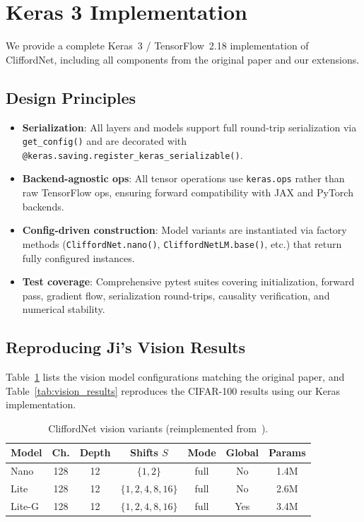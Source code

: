 \documentclass{article}
\begin{document}
\section{Keras 3 Implementation}
\label{sec:implementation}

We provide a complete Keras~3 / TensorFlow~2.18 implementation of CliffordNet, including all components from the original paper and our extensions.

\subsection{Design Principles}

\begin{itemize}
  \item \textbf{Serialization}: All layers and models support full round-trip serialization via \texttt{get\_config()} and are decorated with \texttt{@keras.saving.register\_keras\_serializable()}.
  \item \textbf{Backend-agnostic ops}: All tensor operations use \texttt{keras.ops} rather than raw TensorFlow ops, ensuring forward compatibility with JAX and PyTorch backends.
  \item \textbf{Config-driven construction}: Model variants are instantiated via factory methods (\texttt{CliffordNet.nano()}, \texttt{CliffordNetLM.base()}, etc.) that return fully configured instances.
  \item \textbf{Test coverage}: Comprehensive pytest suites covering initialization, forward pass, gradient flow, serialization round-trips, causality verification, and numerical stability.
\end{itemize}

\subsection{Reproducing Ji's Vision Results}

Table~\ref{tab:vision_variants} lists the vision model configurations matching the original paper, and Table~\ref{tab:vision_results} reproduces the CIFAR-100 results using our Keras implementation.

\begin{table}[t]
\centering
\caption{CliffordNet vision variants (reimplemented from~\citet{ji2026cliffordnet}).}
\label{tab:vision_variants}
\begin{tabular}{lcccccc}
\toprule
\textbf{Model} & \textbf{Ch.} & \textbf{Depth} & \textbf{Shifts $S$} & \textbf{Mode} & \textbf{Global} & \textbf{Params} \\
\midrule
Nano      & 128 & 12 & $\{1, 2\}$           & full  & No  & 1.4M  \\
Lite      & 128 & 12 & $\{1, 2, 4, 8, 16\}$ & full  & No  & 2.6M  \\
Lite-G    & 128 & 12 & $\{1, 2, 4, 8, 16\}$ & full  & Yes & 3.4M  \\
\bottomrule
\end{tabular}
\end{table}
\end{document}
